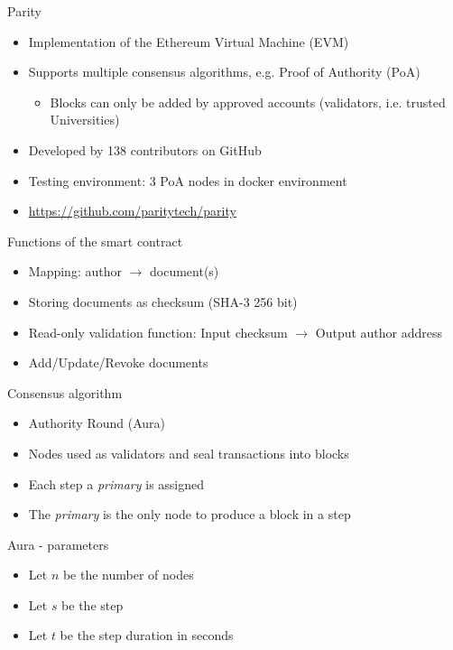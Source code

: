 \documentclass[10pt]{beamer}
\begin{document}
\begin{frame}{Parity}
	\begin{itemize}
		\item Implementation of the Ethereum Virtual Machine (EVM)
		\item Supports multiple consensus algorithms, e.g. Proof of Authority (PoA)
		\begin{itemize}
			\item Blocks can only be added by approved accounts (validators, i.e. trusted Universities)
		\end{itemize}
		\item Developed by 138 contributors on GitHub
		\item Testing environment: 3 PoA nodes in docker environment
		\item \url{https://github.com/paritytech/parity}
	\end{itemize}
\end{frame}

\begin{frame}{Functions of the smart contract}
	\begin{itemize}
		\item Mapping: author  $\rightarrow$ document(s)
		\item Storing documents as checksum (SHA-3 256 bit)
		\item Read-only validation function: Input checksum $\rightarrow$ Output author address
		\item Add/Update/Revoke documents
	\end{itemize}
\end{frame}

\begin{frame}{Consensus algorithm}
	\begin{itemize}
		\item Authority Round (Aura)
		\item Nodes used as validators and seal transactions into blocks
		\item Each step a \textit{primary} is assigned
		\item The \textit{primary} is the only node to produce a block in a step
	\end{itemize}
\end{frame}

\begin{frame}{Aura - parameters}
	\begin{itemize}
		\item Let $n$ be the number of nodes
		\item Let $s$ be the step
		\item Let $t$ be the step duration in seconds
	\end{itemize}
\end{frame}
\end{document}
